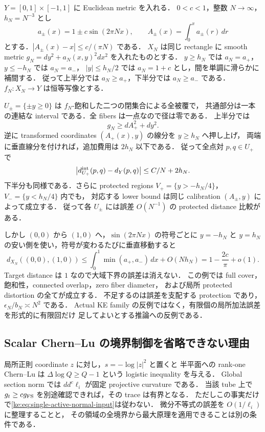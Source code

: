 \begin{example}
\label{ke:full-cover-oscillating-bypass}
$Y=[0,1]\times[-1,1]$ に Euclidean metric を入れる．
$0<c<1$，整数 $N\to\infty$，$h_N=N^{-3}$ とし
\[
 a_\pm(x)=1\pm c\sin(2\pi Nx),\qquad
 A_\pm(x)=\int_0^x a_\pm(r)\,dr
\]
とする．$|A_\pm(x)-x|\le c/(\pi N)$ である．
$X_N$ は同じ rectangle に smooth metric
$g_N=dy^2+a_N(x,y)^2dx^2$ を入れたものとする．
$y\ge h_N$ では $a_N=a_+$，$y\le-h_N$ では $a_N=a_-$，
$|y|\le h_N/2$ では $a_N=1+c$ とし，間を単調に滑らかに補間する．
従って上半分では $a_N\ge a_+$，下半分では $a_N\ge a_-$ である．
$f_N:X_N\to Y$ は恒等写像とする．

$U_\pm=\{\pm y\ge0\}$ は $f_N$-飽和した二つの閉集合による全被覆で，
共通部分は一本の連結な interval である．全 fibers は一点なので径は零である．
上半分では
\[
 g_N\ge dA_+^2+dy^2.
\]
逆に transformed coordinates $(A_+(x),y)$ の線分を $y\ge h_N$ へ押し上げ，
両端に垂直線分を付ければ，追加費用は $2h_N$ 以下である．
従って全点対 $p,q\in U_+$ で
\[
 \big|d_{U_+}^{\rm int}(p,q)-d_Y(p,q)\big|
 \le C/N+2h_N.
\]
下半分も同様である．さらに protected regions
$V_+=\{y>-h_N/4\}$，$V_-=\{y<h_N/4\}$ 内でも，
対応する lower bound は同じ calibration $(A_\pm,y)$ によって成立する．
従って各 $U_\pm$ には誤差 $O(N^{-1})$ の protected distance 比較がある．

しかし $(0,0)$ から $(1,0)$ へ，$\sin(2\pi Nx)$ の符号ごとに
$y=-h_N$ と $y=h_N$ の安い側を使い，符号が変わるたびに垂直移動すると
\[
 d_{X_N}((0,0),(1,0))
 \le\int_0^1\min(a_+,a_-)\,dx+O(Nh_N)
 =1-\frac{2c}{\pi}+o(1).
\]
Target distance は $1$ なので大域下界の誤差は消えない．
この例では full cover，飽和性，connected overlap，zero fiber diameter，
および局所 protected distortion の全てが成立する．
不足するのは誤差を支配する protection であり，$\epsilon_N/b_N\asymp N^2$ である．
Actual KE family の反例ではなく，有限個の局所加法誤差を形式的に有限回だけ
足してよいとする推論への反例である．
\end{example}

\subsection{Scalar Chern--Lu の境界制御を省略できない理由}

局所正則 coordinate $z$ に対し，$s=-\log|z|^2$ と置くと
半平面への rank-one Chern--Lu は
$\Delta\log Q\ge Q-1$ という logistic inequality を与える．
Global section norm では $dd^c\ell_i$ が固定 projective curvature である．
当該 tube 上で $g_t\ge c g_{\rm FS}$ を別途確認できれば，その trace は有界となる．
ただしこの事実だけで\eqref{ke:eq:single-active-normal-input}は従わない．
微分不等式の誤差を $O(1/\ell_i)$ に整理することと，
その領域の全境界から最大原理を適用できることは別の条件である．

